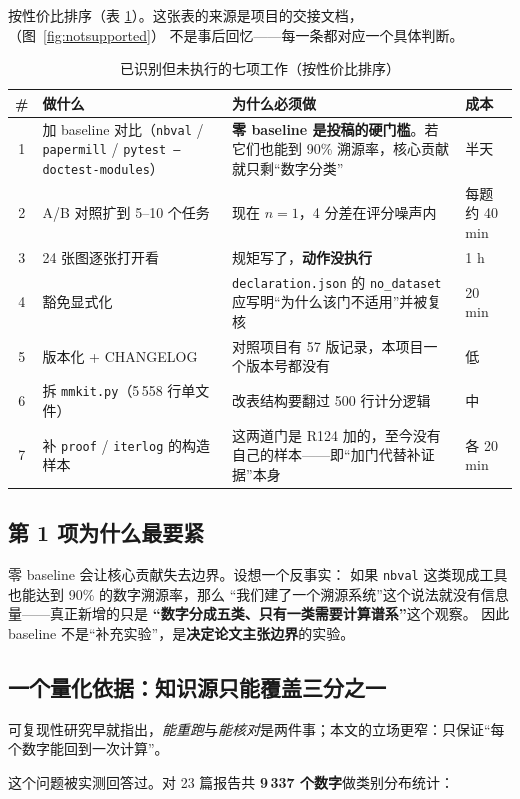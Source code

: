 \documentclass[11pt,a4paper]{article}
\newcommand{\code}[1]{\texttt{#1}}
\begin{document}
按性价比排序（表 \ref{tab:todo}）。这张表的来源是项目的交接文档，（图~\ref{fig:notsupported}）
不是事后回忆——每一条都对应一个具体判断。

\begin{table}[tbp]\centering\small
\caption{已识别但未执行的七项工作（按性价比排序）}\label{tab:todo}
\setlength{\tabcolsep}{4pt}
\begin{tabular}{cp{6.2cm}p{5.4cm}p{1.9cm}}
\toprule
\# & 做什么 & 为什么必须做 & 成本\\
\midrule
1 & 加 baseline 对比（\code{nbval} / \code{papermill} / \code{pytest --doctest-modules}） & \textbf{零 baseline 是投稿的硬门槛}。若它们也能到 90\% 溯源率，核心贡献就只剩“数字分类” & 半天\\
2 & A/B 对照扩到 5--10 个任务 & 现在 $n=1$，4 分差在评分噪声内 & 每题约 40 min\\
3 & 24 张图逐张打开看 & 规矩写了，\textbf{动作没执行} & 1 h\\
4 & 豁免显式化 & \code{declaration.json} 的 \code{no\_dataset} 应写明“为什么该门不适用”并被复核 & 20 min\\
5 & 版本化 + CHANGELOG & 对照项目有 57 版记录，本项目一个版本号都没有 & 低\\
6 & 拆 \code{mmkit.py}（5\,558 行单文件） & 改表结构要翻过 500 行计分逻辑 & 中\\
7 & 补 \code{proof} / \code{iterlog} 的构造样本 & 这两道门是 R124 加的，至今没有自己的样本——即“加门代替补证据”本身 & 各 20 min\\
\bottomrule
\end{tabular}
\end{table}

\subsection{第 1 项为什么最要紧}
零 baseline 会让核心贡献失去边界。设想一个反事实：
如果 \code{nbval} 这类现成工具也能达到 90\% 的数字溯源率，那么
“我们建了一个溯源系统”这个说法就没有信息量——真正新增的只是
\textbf{“数字分成五类、只有一类需要计算谱系”}这个观察。
因此 baseline 不是“补充实验”，是\textbf{决定论文主张边界}的实验。

\subsection{一个量化依据：知识源只能覆盖三分之一}
可复现性研究早就指出，\emph{能重跑}与\emph{能核对}是两件事\cite{ref22,ref23}；本文的立场更窄：只保证“每个数字能回到一次计算”。

这个问题被实测回答过。对 23 篇报告共 \textbf{9\,337 个数字}做类别分布统计：
\end{document}
